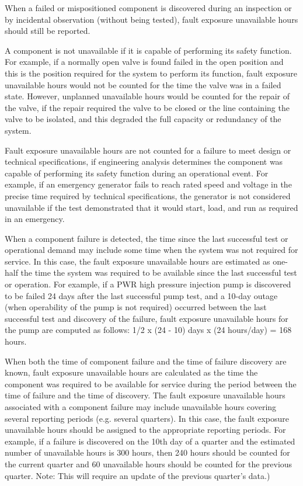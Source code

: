 When a failed or mispositioned component is discovered during an
inspection or by incidental observation (without being tested), fault
exposure unavailable hours should still be reported.

A component is not unavailable if it is capable of performing its
safety function. For example, if a normally open valve is found failed
in the open position and this is the position required for the system
to perform its function, fault exposure unavailable hours would not be
counted for the time the valve was in a failed state. However,
unplanned unavailable hours would be counted for the repair of the
valve, if the repair required the valve to be closed or the line
containing the valve to be isolated, and this degraded the full
capacity or redundancy of the system.

Fault exposure unavailable hours are not counted for a failure to meet
design or technical specifications, if engineering analysis determines
the component was capable of performing its safety function during an
operational event. For example, if an emergency generator fails to
reach rated speed and voltage in the precise time required by
technical specifications, the generator is not considered unavailable
if the test demonstrated that it would start, load, and run as
required in an emergency.

When a component failure is detected, the time since the last
successful test or operational demand may include some time when the
system was not required for service. In this case, the fault exposure
unavailable hours are estimated as one-half the time the system was
required to be available since the last successful test or
operation. For example, if a PWR high pressure injection pump is
discovered to be failed 24 days after the last successful pump test,
and a 10-day outage (when operability of the pump is not required)
occurred between the last successful test and discovery of the
failure, fault exposure unavailable hours for the pump are computed as
follows:  1/2 x (24 - 10) days x (24 hours/day) = 168 hours.

When both the time of component failure and the time of failure discovery are known, fault exposure unavailable hours are calculated as the time the component was required to be available for service during the period between the time of failure and the time of discovery.
The fault exposure unavailable hours associated with a component
failure may include unavailable hours covering several reporting
periods (e.g. several quarters). In this case, the fault exposure
unavailable hours should be assigned to the appropriate reporting
periods. For example, if a failure is discovered on the 10th day of a
quarter and the estimated number of unavailable hours is 300 hours,
then 240 hours should be counted for the current quarter and 60
unavailable hours should be counted for the previous quarter. Note:
This will require an update of the previous quarter's data.)

